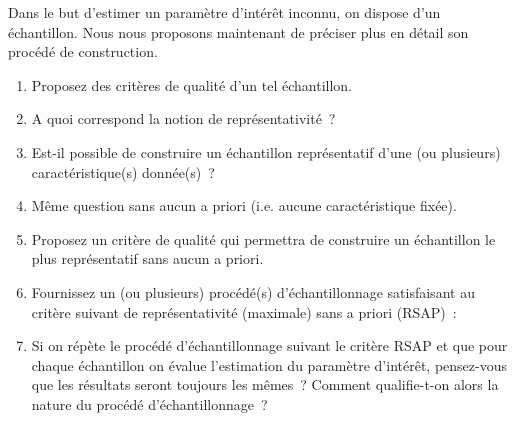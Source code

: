 \documentclass[10pt]{report}
\begin{document}
\begin{exercice}
Dans le but d'estimer un paramètre d'intérêt inconnu, on dispose d'un échantillon. Nous nous proposons maintenant de préciser plus en détail son procédé de construction.
\begin{enumerate}
\item Proposez des critères de qualité d'un tel échantillon.
\item A quoi correspond la notion de représentativité~?


\item Est-il possible de construire un échantillon représentatif d'une (ou plusieurs) caractéristique(s) donnée(s)~?


\item Même question sans aucun a priori (i.e. aucune caractéristique fixée).
\item Proposez un critère de qualité  qui permettra de construire un échantillon le plus représentatif sans aucun a priori.


\item Fournissez un (ou plusieurs) procédé(s) d'échantillonnage satisfaisant au critère suivant de représentativité (maximale) sans a priori (RSAP)~:\\
\centerline{
}


\item Si on répète le procédé d'échantillonnage suivant le critère RSAP et que pour chaque échantillon on évalue l'estimation du paramètre d'intérêt, pensez-vous que les résultats seront toujours les mêmes~? Comment qualifie-t-on alors la nature du procédé d'échantillonnage~?


\end{enumerate}
\end{exercice}
\end{document}
